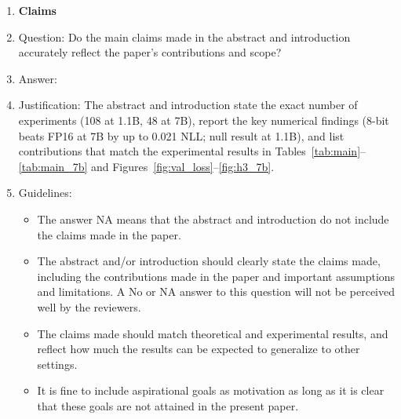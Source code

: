 \documentclass{article}
\begin{document}
\begin{enumerate}

\item {\bf Claims}
\item[] Question: Do the main claims made in the abstract and introduction accurately reflect the paper's contributions and scope?
\item[] Answer: \answerYes{}
\item[] Justification: The abstract and introduction state the exact number of experiments (108 at 1.1B, 48 at 7B), report the key numerical findings (8-bit beats FP16 at 7B by up to 0.021 NLL; null result at 1.1B), and list contributions that match the experimental results in Tables~\ref{tab:main}--\ref{tab:main_7b} and Figures~\ref{fig:val_loss}--\ref{fig:h3_7b}.
\item[] Guidelines:
\begin{itemize}
    \item The answer NA means that the abstract and introduction do not include the claims made in the paper.
    \item The abstract and/or introduction should clearly state the claims made, including the contributions made in the paper and important assumptions and limitations. A No or NA answer to this question will not be perceived well by the reviewers.
    \item The claims made should match theoretical and experimental results, and reflect how much the results can be expected to generalize to other settings.
    \item It is fine to include aspirational goals as motivation as long as it is clear that these goals are not attained in the present paper.
\end{itemize}


\end{enumerate}
\end{document}
